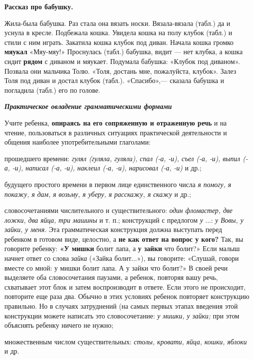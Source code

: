\documentclass[a5paper]{book}
\renewcommand{\emph}[1]{\textit{#1}}
\begin{document}
\textbf{Рассказ про бабушку.}

Жила-была бабушка. Раз стала она вязать носки. Вязала-вязала (табл.) да
и уснула в кресле. Подбежала кошка. Увидела кошка на полу клубок (табл.)
и стили с ним играть. Закатила кошка клубок под диван. Начала кошка
громко \textbf{мяукал} «Мяу-мяу!» Проснулась (табл.) бабушка, видит ---
нет клубка, а кошка сидит \textbf{рядом} с диваном и мяукает. Подумала
бабушка: «Клубок под диваном». Позвала они мальчика Толю. «Толя, достань
мне, пожалуйста, клубок». Залез Толя под диван и достал клубок (табл.).
«Спасибо»,--- сказала бабушка и погладила (табл.) его по голове.

\emph{\textbf{Практическое овладение грамматическими формами}}

Учите ребенка, \textbf{опираясь на его сопряженную и отраженную речь} и
на чтение, пользоваться в различных ситуациях практической деятельности
и общения наиболее употребительными глаголами:

прошедшего времени: \emph{гулял (гуляла, гуляли), спал (-а, -и), съел
(-а, -и), выпил (-а, -и), написал (-а, -и), наклеил (-а, -и), нарисовал
(-а, -и)} и др.;

будущего простого времени в первом лице единственного числа \emph{я
помогу, я покажу, я дам, я возьму, я уберу, я расскажу, я скажу} и др.;

словосочетаниями числительного и существительного: \emph{один фломастер,
две ложки, два яйца, три машины} и т. п.; конструкций с предлогом
\emph{у} ...: \emph{у Вовы, у зайки, у меня.} Эта грамматическая
конструкция должна выступать перед ребенком в готовом виде, целостно, а
\textbf{не как ответ на вопрос у кого?} Так, вы говорите ребенку:
\textbf{«У мишки} болит лапа, а \textbf{у зайки} что болит?» Если малыш
начнет ответ со слова \emph{зайка} («Зайка болит...»), вы говорите:
«Слушай, говори вместе со мной: у мишки \textbar болит лапа. А у зайки
\textbar что болит?» В своей речи выделяете оба словосочетания паузами,
а ребенок, повторяя вашу речь, схватывает этот блок и затем
воспроизводит в ответе. Если этого не происходит, повторите еще раза
два. Обычно в этих условиях ребенок повторяет конструкцию правильно. Но
в случаях затруднений (на самых первых этапах введения этой конструкции
можете написать это словосочетание: \emph{у мишки, у зайки;} при этом
объяснять ребенку ничего не нужно;

множественным числом существительных: \emph{столы, кровати, яйца, кошки,
яблоки} и др.
\end{document}
